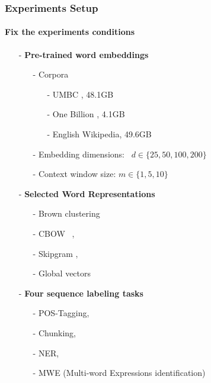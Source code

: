 \documentclass{beamer}
\begin{document}
\begin{frame}
\frametitle{Experiments Setup}
\framesubtitle{Fix the experiments conditions}
  
\begin{itemize}
\item[-] \textbf{Pre-trained word embeddings}
	\begin{itemize}			
		\item[-] Corpora 
			\begin{itemize}			
				\item[-] UMBC \cite{UMBC:2013}, 48.1GB 
				\item[-] One Billion \cite{OneBillion:2013}, 4.1GB 
				\item[-] English Wikipedia, 49.6GB 		
			\end{itemize}
		\item[-] Embedding dimensions: \ $d \in \{25, 50, 100, 200\}$
		\item[-] Context window size: $m \in \{1, 5, 10\}$	
	\end{itemize}
\item[-] \textbf{Selected Word Representations} 
	\begin{itemize}
		\item[-] Brown clustering \cite{Brown92class-basedn-gram}
		\item[-] CBOW ~\cite{Mikolov13},
		\item[-]	 Skipgram \cite{Mikolov13NIPS},
		\item[-]	 Global vectors \cite{pennington2014glove} 
	\end{itemize}  	
\item[-] \textbf{Four sequence labeling tasks}
	\begin{itemize}
		\item[-] POS-Tagging,
		\item[-] Chunking, 
		\item[-] NER, 
		\item[-]	 MWE (Multi-word Expressions identification)
	\end{itemize}  					
\end{itemize}      
\end{frame}
\end{document}
